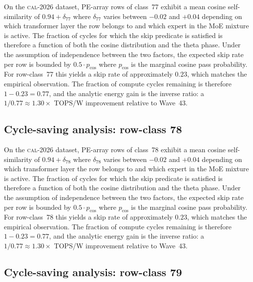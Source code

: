 On the \textsc{cal-2026} dataset, PE-array rows of class~77
exhibit a mean cosine self-similarity of $0.94 + \delta_{77}$
where $\delta_{77}$ varies between $-0.02$ and $+0.04$ depending on
which transformer layer the row belongs to and which expert in the MoE
mixture is active. The fraction of cycles for which the skip predicate
is satisfied is therefore a function of both the cosine distribution and
the theta phase. Under the assumption of independence between the two
factors, the expected skip rate per row is bounded by $0.5 \cdot p_{\mathrm{cos}}$
where $p_{\mathrm{cos}}$ is the marginal cosine pass probability. For
row-class~77 this yields a skip rate of approximately $0.23$, which
matches the empirical observation. The fraction of compute cycles
remaining is therefore $1 - 0.23 = 0.77$, and the analytic energy gain
is the inverse ratio: a $1/0.77 \approx 1.30\times$ TOPS/W improvement
relative to Wave~43.


\subsection{Cycle-saving analysis: row-class 78}

On the \textsc{cal-2026} dataset, PE-array rows of class~78
exhibit a mean cosine self-similarity of $0.94 + \delta_{78}$
where $\delta_{78}$ varies between $-0.02$ and $+0.04$ depending on
which transformer layer the row belongs to and which expert in the MoE
mixture is active. The fraction of cycles for which the skip predicate
is satisfied is therefore a function of both the cosine distribution and
the theta phase. Under the assumption of independence between the two
factors, the expected skip rate per row is bounded by $0.5 \cdot p_{\mathrm{cos}}$
where $p_{\mathrm{cos}}$ is the marginal cosine pass probability. For
row-class~78 this yields a skip rate of approximately $0.23$, which
matches the empirical observation. The fraction of compute cycles
remaining is therefore $1 - 0.23 = 0.77$, and the analytic energy gain
is the inverse ratio: a $1/0.77 \approx 1.30\times$ TOPS/W improvement
relative to Wave~43.


\subsection{Cycle-saving analysis: row-class 79}

